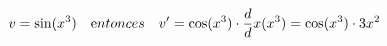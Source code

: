 \documentclass[preview]{standalone}
\begin{document}
\begin{align*}
v = \sin(x^3) \quad \text entonces  \quad v' = \cos(x^3) \cdot \frac d dx (x^3) = \cos(x^3) \cdot 3x^2
\end{align*}
\end{document}

